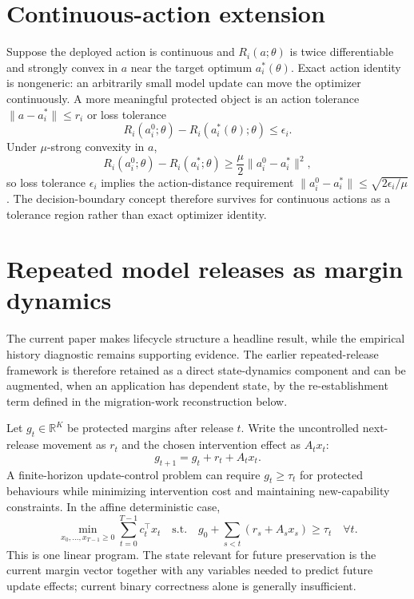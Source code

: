 \documentclass[11pt,letterpaper]{article}
\theoremstyle{plain}
\newcommand{\1}{\mathbf 1}
\begin{document}
\section{Continuous-action extension}
Suppose the deployed action is continuous and $R_i(a;\theta)$ is twice differentiable and strongly convex in $a$ near the target optimum $a_i^*(\theta)$. Exact action identity is nongeneric: an arbitrarily small model update can move the optimizer continuously. A more meaningful protected object is an action tolerance $\|a-a_i^*\|\le r_i$ or loss tolerance
\begin{equation}
 R_i(a_i^0;\theta)-R_i(a_i^*(\theta);\theta)\le\epsilon_i.
\label{eq:s_continuous_tol}
\end{equation}
Under $\mu$-strong convexity in $a$,
\begin{equation}
 R_i(a_i^0;\theta)-R_i(a_i^*;\theta)\ge\frac\mu2\|a_i^0-a_i^*\|^2,
\label{eq:s_strong_convex}
\end{equation}
so loss tolerance $\epsilon_i$ implies the action-distance requirement $\|a_i^0-a_i^*\|\le\sqrt{2\epsilon_i/\mu}$. The decision-boundary concept therefore survives for continuous actions as a tolerance region rather than exact optimizer identity.

\section{Repeated model releases as margin dynamics}
The current paper makes lifecycle structure a headline result, while the empirical history diagnostic remains supporting evidence. The earlier repeated-release framework is therefore retained as a direct state-dynamics component and can be augmented, when an application has dependent state, by the re-establishment term defined in the migration-work reconstruction below.

Let $g_t\in\mathbb R^K$ be protected margins after release $t$. Write the uncontrolled next-release movement as $r_t$ and the chosen intervention effect as $A_t x_t$:
\begin{equation}
 g_{t+1}=g_t+r_t+A_t x_t.
\label{eq:s_margin_dynamics}
\end{equation}
A finite-horizon update-control problem can require $g_t\ge\tau_t$ for protected behaviours while minimizing intervention cost and maintaining new-capability constraints. In the affine deterministic case,
\begin{equation}
 \min_{x_0,\ldots,x_{T-1}\ge0}\sum_{t=0}^{T-1}c_t^\top x_t
\quad\text{s.t.}\quad
 g_0+\sum_{s<t}(r_s+A_sx_s)\ge\tau_t\quad\forall t.
\label{eq:s_multirelease_lp}
\end{equation}
This is one linear program. The state relevant for future preservation is the current margin vector together with any variables needed to predict future update effects; current binary correctness alone is generally insufficient.
\end{document}
